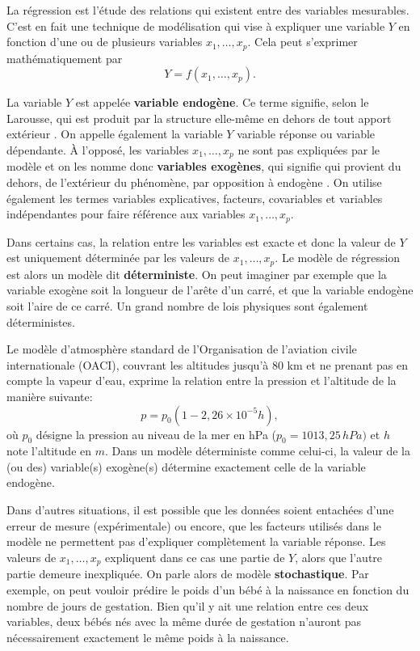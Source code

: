 La régression est l'étude des relations qui existent entre des variables mesurables. C'est en fait une technique de modélisation qui vise à expliquer une variable $Y$ en fonction d'une ou de plusieurs variables $x_1,\ldots,x_p$. Cela peut s'exprimer mathématiquement par
\begin{equation}
Y=f(x_1,\ldots,x_p).
\end{equation}

La variable $Y$ est appel\'ee \textbf{variable endogène}. Ce terme signifie, selon le Larousse, \og qui est produit par la structure elle-même en dehors de tout apport extérieur \fg . On appelle également la variable $Y$ variable réponse ou variable dépendante. À l'opposé, les variables $x_1,\ldots,x_p$ ne sont pas expliquées par le modèle et on les nomme donc \textbf{variables exogènes}, qui signifie \og qui provient du dehors, de l'extérieur du phénomène, par opposition à endogène \fg. On utilise également les termes variables explicatives, facteurs, covariables et variables indépendantes pour faire référence aux variables $x_1,\ldots,x_p$.


Dans certains cas, la relation entre les variables est exacte et donc la valeur de $Y$ est uniquement déterminée par les valeurs de $x_1,\ldots,x_p$. Le mod\`ele de r\'egression est alors un modèle dit \textbf{déterministe}. On peut imaginer par exemple que la variable exogène soit la longueur de l'arête d'un carré, et que la variable endogène soit l'aire de ce carré. Un grand nombre de lois physiques sont également déterministes. 

\begin{exemple}
    Le modèle d'atmosphère standard de l'Organisation de l'aviation civile internationale (OACI), couvrant les altitudes jusqu'à 80 km et ne prenant pas en compte la vapeur d'eau, exprime la relation entre la pression et l'altitude de la manière suivante:
$$p=p_0(1-2,26\times10^{-5}h),$$ où $p_0$ désigne la pression au niveau de la mer en hPa ($p_0=1013,25\,hPa)$ et $h$ note l'altitude en $m$. Dans un modèle déterministe comme celui-ci, la valeur de la (ou des) variable(s) exogène(s) détermine exactement celle de la variable endogène.
\end{exemple}


Dans d'autres situations, il est possible que les données soient entachées d'une erreur de mesure (expérimentale) ou encore, que les facteurs utilisés dans le modèle ne permettent pas d'expliquer complètement la variable réponse. Les valeurs de $x_1,\ldots,x_p$ expliquent dans ce cas une partie de $Y$, alors que l'autre partie demeure inexpliquée. On parle alors de modèle \textbf{stochastique}. Par exemple, on peut vouloir prédire le poids d'un bébé à la naissance en fonction du nombre de jours de gestation. Bien qu'il y ait une relation entre ces deux variables,  deux bébés nés avec la même durée de gestation n'auront pas nécessairement exactement le même poids à la naissance.

